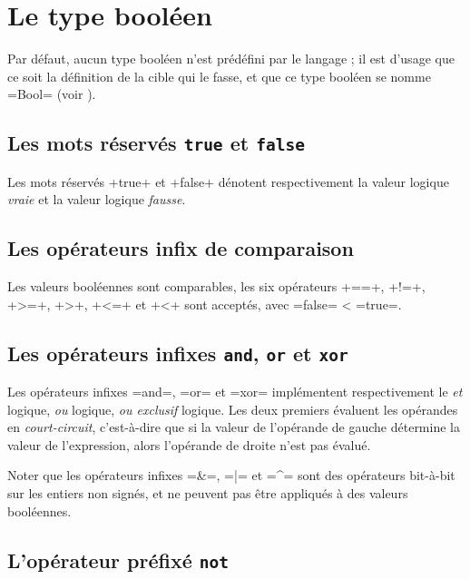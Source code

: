 




\chapter{Le type booléen}


Par défaut, aucun type booléen n'est prédéfini par le langage ; il est d'usage que ce soit la définition de la cible qui le fasse, et que ce type booléen se nomme \plm=Bool= (voir ).



\section{Les mots réservés \texttt{true} et \texttt{false}}

Les mots réservés \plm+true+ et \plm+false+ dénotent respectivement la valeur logique \emph{vraie} et la valeur logique \emph{fausse}.

\section{Les opérateurs infix de comparaison}

Les valeurs booléennes sont comparables, les six opérateurs \plm+==+, \plm+!=+, \plm+>=+, \plm+>+, \plm+<=+ et \plm+<+ sont acceptés, avec \plm=false= < \plm=true=.
 
\section{Les opérateurs infixes \texttt{and}, \texttt{or} et \texttt{xor}}

Les opérateurs infixes \plm=and=, \plm=or= et \plm=xor= implémentent respectivement le \emph{et} logique, \emph{ou} logique, \emph{ou exclusif} logique. Les deux premiers évaluent les opérandes en \emph{court-circuit}, c'est-à-dire que si la valeur de l'opérande de gauche détermine la valeur de l'expression, alors l'opérande de droite n'est pas évalué.

Noter que les opérateurs infixes \plm=&=, \plm=|= et \plm=^= sont des opérateurs bit-à-bit sur les entiers non signés, et ne peuvent pas être appliqués à des valeurs booléennes.


\section{L'opérateur préfixé \texttt{not}}

